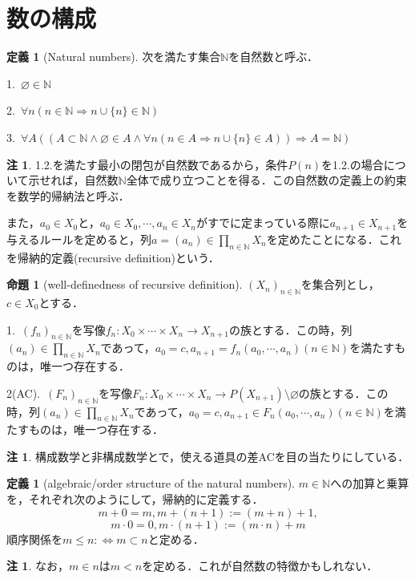 \documentclass[uplatex, 12pt, dvipdfmx]{jsreport}
\theoremstyle{definition}
\newtheorem{proposition}[theorem]{命題}
\newtheorem{definition}[theorem]{定義}
\newtheorem{remark}[theorem]{注}
\theoremstyle{StatementsWithStar}
\theoremstyle{StatementsWithStar2}
\theoremstyle{StatementsWithStar3}
\theoremstyle{StatementsWithCCirc}
\theoremstyle{definition}
\begin{document}
\section{数の構成}

\begin{definition}[Natural numbers]\rm{}
    次を満たす集合$\mathbb{N}$を自然数と呼ぶ．

    1.\, $\varnothing\in\mathbb{N}$

    2.\, $\forall n(n\in\mathbb{N}\Rightarrow n\cup\{ n\}\in\mathbb{N})$

    3.\, $\forall A((A\subset\mathbb{N}\wedge\varnothing\in A\wedge\forall n(n\in A\Rightarrow n\cup\{n\}\in A))\Rightarrow A=\mathbb{N})$
\end{definition}
\begin{remark}\rm{}
    1.2.を満たす最小の閉包が自然数であるから，条件$P(n)$を1.2.の場合について示せれば，自然数$\mathbb{N}$全体で成り立つことを得る．この自然数の定義上の約束を数学的帰納法と呼ぶ．

    また，$a_0\in X_0$と，$a_0\in X_0,\cdots,a_n\in X_n$がすでに定まっている際に$a_{n+1}\in X_{n+1}$を与えるルールを定めると，列$a=(a_n)\in\prod_{n\in\mathbb{N}}X_n$を定めたことになる．これを帰納的定義(recursive definition)という．
\end{remark}

\begin{proposition}[well-definedness of recursive definition]\rm{}
    $(X_n)_{n\in\mathbb{N}}$を集合列とし，$c\in X_0$とする．

    1.\, $(f_n)_{n\in\mathbb{N}}$を写像$f_n:X_0\times\cdots\times X_n\to X_{n+1}$の族とする．この時，列$(a_n)\in\prod_{n\in\mathbb{N}}X_n$であって，$a_0=c, a_{n+1}=f_n(a_0,\cdots,a_n)(n\in\mathbb{N})$を満たすものは，唯一つ存在する．

    2(AC).\, $(F_n)_{n\in\mathbb{N}}$を写像$F_n:X_0\times\cdots\times X_n\to P(X_{n+1})\setminus\varnothing$の族とする．この時，列$(a_n)\in\prod_{n\in\mathbb{N}}X_n$であって，$a_0=c, a_{n+1}\in F_n(a_0,\cdots,a_n)(n\in\mathbb{N})$を満たすものは，唯一つ存在する．
\end{proposition}
\begin{remark}\rm{}
    構成数学と非構成数学とで，使える道具の差ACを目の当たりにしている．
\end{remark}

\begin{definition}[algebraic/order structure of the natural numbers]
    $m\in\mathbb{N}$への加算と乗算を，それぞれ次のようにして，帰納的に定義する．
    \[ m+0=m, m+(n+1):=(m+n)+1, \]\[ m\cdot 0=0, m\cdot (n+1):=(m\cdot n)+m \]
    順序関係を$m\le n:\Leftrightarrow m\subset n$と定める．
\end{definition}
\begin{remark}
    なお，$m\in n$は$m<n$を定める．これが自然数の特徴かもしれない．
\end{remark}
\end{document}
